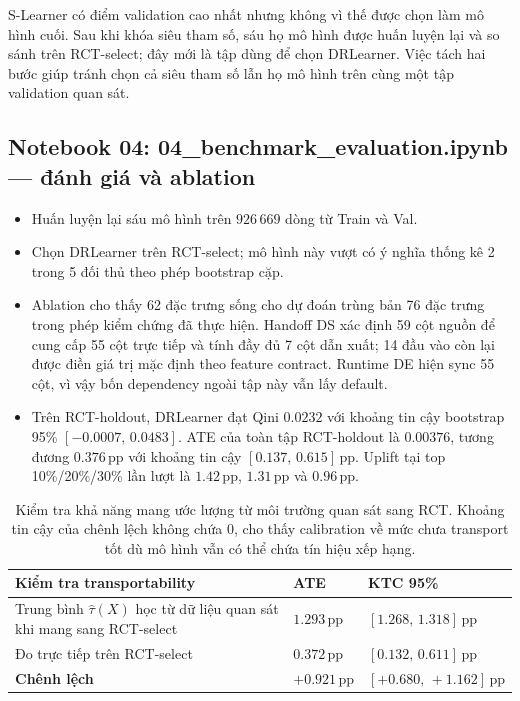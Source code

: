 \documentclass[11pt,a4paper]{article}
\DeclareRobustCommand{\code}[1]{{\small\texttt{#1}}}
\newcommand{\pp}{\ensuremath{\,\text{pp}}}
\def\code#1{#1}%
\begin{document}
S-Learner có điểm validation cao nhất nhưng không vì thế được chọn làm mô
hình cuối. Sau khi khóa siêu tham số, sáu họ mô hình được huấn luyện lại và
so sánh trên \code{RCT-select}; đây mới là tập dùng để chọn DRLearner. Việc
tách hai bước giúp tránh chọn cả siêu tham số lẫn họ mô hình trên cùng một
tập validation quan sát.

\subsection{Notebook 04: \code{04\_benchmark\_evaluation.ipynb} --- đánh giá và ablation}
\begin{itemize}
    \item Huấn luyện lại sáu mô hình trên $926\,669$ dòng từ \code{Train}
    và \code{Val}.
    \item Chọn DRLearner trên \code{RCT-select}; mô hình này vượt có ý nghĩa
    thống kê 2 trong 5 đối thủ theo phép bootstrap cặp.
    \item Ablation cho thấy 62 đặc trưng sống cho dự đoán trùng bản 76 đặc
    trưng trong phép kiểm chứng đã thực hiện. Handoff DS xác định 59 cột nguồn
    để cung cấp 55 cột trực tiếp và tính đầy đủ 7 cột dẫn xuất; 14 đầu vào
    còn lại được điền giá trị mặc định theo feature contract. Runtime DE hiện
    sync 55 cột, vì vậy bốn dependency ngoài tập này vẫn lấy default.
    \item Trên \code{RCT-holdout}, DRLearner đạt Qini $0.0232$ với khoảng
    tin cậy bootstrap 95\% $[-0.0007,\,0.0483]$. ATE của toàn tập RCT-holdout
    là $0.00376$, tương đương $0.376\pp$ với khoảng tin cậy
    $[0.137,\,0.615]\pp$. Uplift tại top 10\%/20\%/30\% lần lượt là
    $1.42\pp$, $1.31\pp$ và $0.96\pp$.
\end{itemize}

\begin{table}[H]
\centering
\small
\begin{tabularx}{0.9\textwidth}{X>{\centering\arraybackslash}p{3.2cm}
    >{\centering\arraybackslash}p{3.5cm}}
\toprule
\textbf{Kiểm tra transportability} & \textbf{ATE} & \textbf{KTC 95\%} \\
\midrule
Trung bình $\hat\tau(X)$ học từ dữ liệu quan sát khi mang sang \code{RCT-select} & $1.293\pp$ & $[1.268,\,1.318]\pp$ \\
Đo trực tiếp trên \code{RCT-select} & $0.372\pp$ & $[0.132,\,0.611]\pp$ \\
\textbf{Chênh lệch} & \textbf{$+0.921\pp$} & \textbf{$[+0.680,\,+1.162]\pp$} \\
\bottomrule
\end{tabularx}
\caption{Kiểm tra khả năng mang ước lượng từ môi trường quan sát sang RCT.
Khoảng tin cậy của chênh lệch không chứa 0, cho thấy calibration về mức chưa
transport tốt dù mô hình vẫn có thể chứa tín hiệu xếp hạng.}
\label{tab:transportability}
\end{table}
\end{document}
